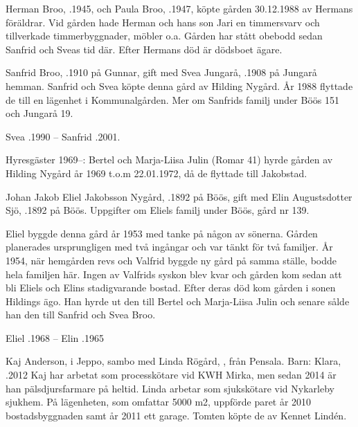
Herman Broo, .1945, och Paula Broo, .1947, köpte gården 30.12.1988 av Hermans föräldrar. Vid gården hade Herman och hans son Jari en timmersvarv och tillverkade timmerbyggnader, möbler o.a. Gården har stått obebodd sedan Sanfrid och Sveas tid där. Efter Hermans död är dödsboet ägare.


Sanfrid Broo, .1910 på Gunnar, gift med Svea Jungarå, .1908 på Jungarå hemman. Sanfrid och Svea köpte denna gård av Hilding Nygård. År 1988 flyttade de till en lägenhet i Kommunalgården. Mer om Sanfrids familj under Böös 151 och Jungarå 19.

Svea .1990  --  Sanfrid .2001.

Hyresgäster 1969--: Bertel och Marja-Liisa Julin (Romar 41) hyrde gården av  Hilding Nygård år 1969 t.o.m 22.01.1972, då de flyttade till Jakobstad.


Johan Jakob Eliel Jakobsson Nygård, .1892 på Böös, gift med Elin Augustsdotter Sjö, .1892 på Böös. Uppgifter om Eliels familj under Böös, gård nr 139.

Eliel byggde denna gård år 1953 med tanke på någon av sönerna. Gården planerades ursprungligen med två ingångar och var tänkt för två familjer. År 1954, när hemgården revs och Valfrid byggde ny gård på samma ställe, bodde hela familjen här. Ingen av Valfrids syskon blev kvar och gården kom sedan att bli Eliels och Elins stadigvarande bostad. Efter deras död kom gården i sonen Hildings ägo. Han hyrde ut den till Bertel och Marja-Liisa Julin och senare sålde han den till Sanfrid och Svea Broo.

Eliel .1968  --  Elin .1965




Kaj Anderson,  i Jeppo, sambo med Linda Rögård, , från Pensala.
Barn: Klara, .2012
Kaj har arbetat som processkötare vid KWH Mirka, men sedan 2014  är	han pälsdjursfarmare på heltid. Linda arbetar som sjukskötare vid Nykarleby sjukhem. På lägenheten, som omfattar 5000 m2, uppförde paret  år 2010 bostadsbyggnaden samt år 2011 ett garage. Tomten köpte de av Kennet Lindén.



